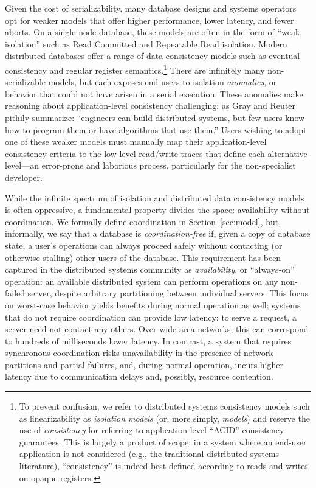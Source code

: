 
Given the cost of serializability, many database designs and systems
operators opt for weaker models that offer higher performance, lower
latency, and fewer aborts. On a single-node database, these models are
often in the form of ``weak isolation'' such as Read Committed and
Repeatable Read isolation. Modern distributed databases offer a range
of data consistency models such as eventual consistency and regular
register semantics.\footnote{To prevent confusion, we refer to
  distributed systems consistency models such as linearizability as
  \textit{isolation models} (or, more simply, \textit{models}) and
  reserve the use of \textit{consistency} for referring to
  application-level ``ACID'' consistency guarantees. This is largely a
  product of scope: in a system where an end-user application is not
  considered (e.g., the traditional distributed systems literature),
  ``consistency'' is indeed best defined according to reads and writes
  on opaque registers.}  There are infinitely many non-serializable
models, but each exposes end users to isolation \textit{anomalies}, or
behavior that could not have arisen in a serial execution. These
anomalies make reasoning about application-level consistency
challenging; as Gray and Reuter pithily summarize: ``engineers can
build distributed systems, but few users know how to program them or
have algorithms that use them.''  Users wishing to adopt one of these
weaker models must manually map their application-level consistency
criteria to the low-level read/write traces that define each
alternative level---an error-prone and laborious process, particularly
for the non-specialist developer.


 While the infinite spectrum
of isolation and distributed data consistency models is often
oppressive, a fundamental property divides the space: availability
without coordination. We formally define coordination in
Section~\ref{sec:model}, but, informally, we say that a database is
\textit{coordination-free} if, given a copy of database state, a
user's operations can always proceed safely without contacting (or
otherwise stalling) other users of the database. This requirement has
been captured in the distributed systems community as
\textit{availability}, or ``always-on'' operation: an available
distributed system can perform operations on any non-failed server,
despite arbitrary partitioning between individual servers. This focus
on worst-case behavior yields benefits during normal operation as
well; systems that do not require coordination can provide low
latency: to serve a request, a server need not contact any
others. Over wide-area networks, this can correspond to hundreds of
milliseconds lower latency. In contrast, a system that requires
synchronous coordination risks unavailability in the presence of
network partitions and partial failures, and, during normal operation,
incurs higher latency due to communication delays and, possibly,
resource contention.

